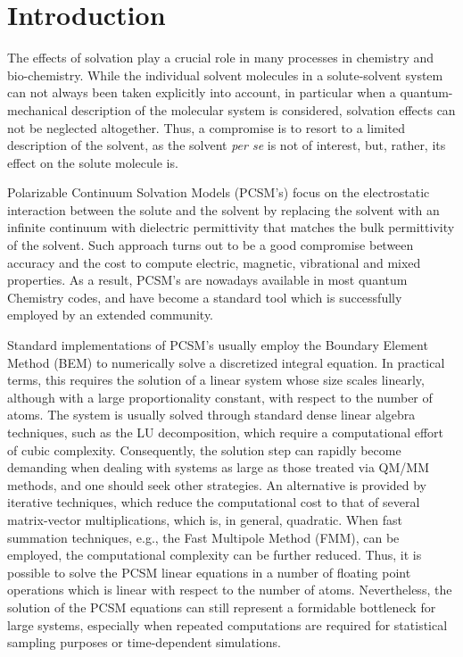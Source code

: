 \section{Introduction}\label{sec:intro}

The effects of solvation play a crucial role in many processes in chemistry and bio-chemistry. While the individual solvent molecules in a solute-solvent system can not always been taken explicitly into account, in particular when a quantum-mechanical description of the molecular system is considered,  solvation effects can not be neglected altogether. Thus, a compromise is to resort to a limited description of the solvent, as the solvent {\it per se} is not of interest, but, rather, its effect on the solute molecule is.

Polarizable Continuum Solvation Models (PCSM's)\cite{ReviewPCM_2005,Cramer:1999wt,Orozco_CR_Solvent00,Klamt:2011we,Mennucci:2012ct,honig1995cla,Roux:1999vp,Klamt_JCS_Cosmo,Chipman_JCP_SSVPE,Chipman_JCP_SSVPE2,Mennucci_JCP_IEF1,Mennucci_JMC_IEF2,Mennucci_JPCB_IEF3, Barone_JCPA_CPCM,Cossi_JCC_CPCM, Lipparini_JCP_VPCM,Lipparini_JCTC_VPCMSCF,Truhlar_JPCB_SMD}  focus on the electrostatic interaction between the solute and the solvent by replacing the solvent with an infinite continuum with dielectric permittivity that matches the bulk permittivity of the solvent.
Such approach turns out to be a good compromise between accuracy and the cost to compute electric, magnetic, vibrational and mixed properties\cite{Mennucci_JPCL_PCM,Mennucci:2012ct,ReviewPCM_2005}. As a result, PCSM's are nowadays available in most quantum Chemistry codes, and have become a standard tool which is successfully employed by an extended community. 

Standard implementations of PCSM's usually employ the Boundary Element Method\cite{MST,ReviewPCM_1994,ReviewPCM_2005,Scalmani_JCP_CSC,York_JPCA_CSC,
Herbert_JCP_ISWIG} (BEM) to numerically solve a discretized integral equation. In practical terms, this requires the solution of a linear system whose size scales linearly, although with a large proportionality constant, with respect to the number of atoms. The system is usually solved through standard dense linear algebra techniques, such as the LU decomposition\cite{Cammi_JCC_Inversion}, which require a computational effort of cubic complexity. Consequently, the solution step can rapidly become demanding when dealing with systems as large as those treated via QM/MM methods, and one should seek other strategies. An alternative is provided by iterative techniques, which reduce the computational cost to that of several matrix-vector multiplications\cite{Scalmani_TCA_Iterative}, which is, in general, quadratic. When fast summation techniques, e.g., the Fast Multipole Method (FMM)\cite{FMM}, can be employed, the computational complexity can be further reduced. Thus, it is possible to solve the PCSM linear equations in a number of floating point operations which is linear with respect to the number of atoms. Nevertheless, the solution of the PCSM equations can still represent a formidable bottleneck for large systems\cite{Lipparini_JPCL_ddCOSMO}, especially when repeated computations are required for statistical sampling purposes or time-dependent simulations.

